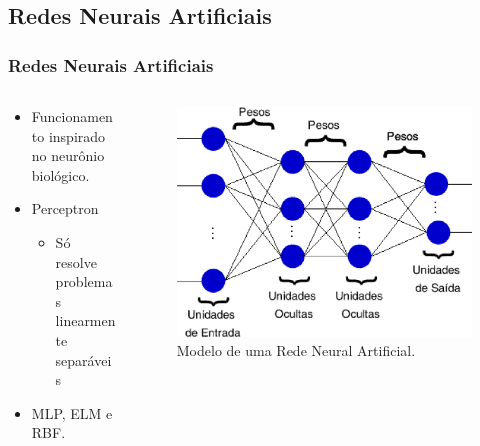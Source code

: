\documentclass{beamer}
\begin{document}
\subsection{Redes Neurais Artificiais}
\begin{frame}\frametitle{Redes Neurais Artificiais}

\begin{minipage}[0.2\textheight]{\textwidth}
\begin{columns}[T]
	\begin{column}{0.6\textwidth}
		\begin{itemize}
		\item Funcionamento inspirado no neurônio biológico.
		\item Perceptron
			\begin{itemize}
				\item Só resolve problemas linearmente separáveis
			\end{itemize}
		\item MLP, ELM e RBF.
		\end{itemize}
	\end{column}

	\begin{column}{0.4\textwidth}
		\begin{figure}[htpb]
			\includegraphics[width=1.0\textwidth]{rna.eps}
			\caption{Modelo de uma Rede Neural Artificial.}
		\end{figure}  
	\end{column}
\end{columns}
\end{minipage}

\end{frame}
\end{document}
